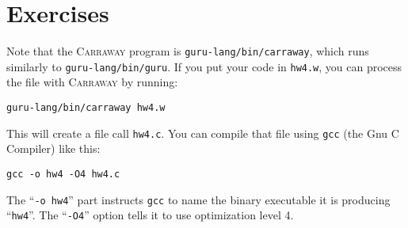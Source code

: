 \documentclass{book}[12pt]
\newcommand{\carraway}[0]{\textsc{Carraway}\xspace}
\begin{document}
\section{Exercises}

Note that the \carraway program is \texttt{guru-lang/bin/carraway},
which runs similarly to \texttt{guru-lang/bin/guru}.  If you put your code in \texttt{hw4.w}, you
can process the file with \carraway by running:

\begin{verbatim}
guru-lang/bin/carraway hw4.w
\end{verbatim}

\noindent 
This will create a file call \texttt{hw4.c}.  You can compile that
file using \texttt{gcc} (the Gnu C Compiler) like this:

\begin{verbatim}
gcc -o hw4 -O4 hw4.c
\end{verbatim}

\noindent The ``\texttt{-o hw4}'' part instructs \texttt{gcc} to name
the binary executable it is producing ``\texttt{hw4}''.  The
``\texttt{-O4}'' option tells it to use optimization level 4.
\end{document}
